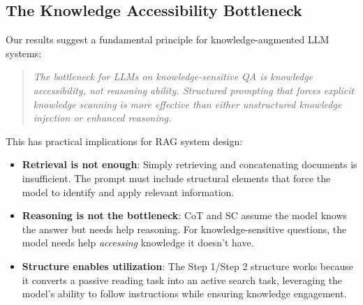 \subsection{The Knowledge Accessibility Bottleneck}

Our results suggest a fundamental principle for knowledge-augmented LLM systems:

\begin{quote}
\emph{The bottleneck for LLMs on knowledge-sensitive QA is knowledge accessibility, not reasoning ability. Structured prompting that forces explicit knowledge scanning is more effective than either unstructured knowledge injection or enhanced reasoning.}
\end{quote}

This has practical implications for RAG system design:
\begin{itemize}
\item \textbf{Retrieval is not enough}: Simply retrieving and concatenating documents is insufficient. The prompt must include structural elements that force the model to identify and apply relevant information.
\item \textbf{Reasoning is not the bottleneck}: CoT and SC assume the model knows the answer but needs help reasoning. For knowledge-sensitive questions, the model needs help \emph{accessing} knowledge it doesn't have.
\item \textbf{Structure enables utilization}: The Step 1/Step 2 structure works because it converts a passive reading task into an active search task, leveraging the model's ability to follow instructions while ensuring knowledge engagement.
\end{itemize}
